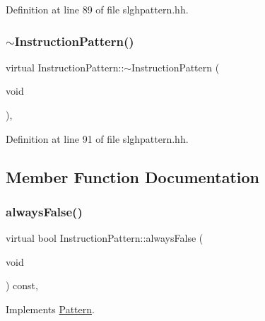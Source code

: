 Definition at line 89 of file slghpattern.\+hh.

\mbox{\label{class_instruction_pattern_a935c0e36b286f4b025e99f8230e3a22d}} 
\subsubsection{\texorpdfstring{$\sim$InstructionPattern()}{~InstructionPattern()}}
{\footnotesize\ttfamily virtual Instruction\+Pattern\+::$\sim$\+Instruction\+Pattern (\begin{DoxyParamCaption}\item[{void}]{ }\end{DoxyParamCaption})\hspace{0.3cm}{\ttfamily [inline]}, {\ttfamily [virtual]}}



Definition at line 91 of file slghpattern.\+hh.



\subsection{Member Function Documentation}
\mbox{\label{class_instruction_pattern_a0b239a933cc9220adb175d602919986d}} 
\subsubsection{\texorpdfstring{alwaysFalse()}{alwaysFalse()}}
{\footnotesize\ttfamily virtual bool Instruction\+Pattern\+::always\+False (\begin{DoxyParamCaption}\item[{void}]{ }\end{DoxyParamCaption}) const\hspace{0.3cm}{\ttfamily [inline]}, {\ttfamily [virtual]}}



Implements \mbox{\hyperlink{class_pattern_ab7e66817fda44ad29954c8cfcb9c9266}{Pattern}}.



